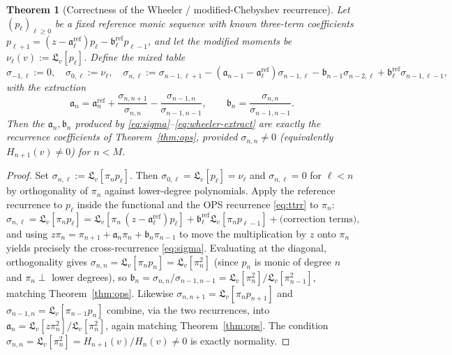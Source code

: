 \documentclass[11pt]{article}
\theoremstyle{plain}
\newtheorem{theorem}{Theorem}[section]
\theoremstyle{definition}
\theoremstyle{remark}
\begin{document}
\begin{theorem}[Correctness of the Wheeler / modified-Chebyshev recurrence]
\label{thm:wheeler}
Let $(p_\ell)_{\ell\ge0}$ be a fixed reference monic sequence with known
three-term coefficients $p_{\ell+1}=(z-\mathfrak a_\ell^{\mathrm{ref}})p_\ell
-\mathfrak b_\ell^{\mathrm{ref}}p_{\ell-1}$, and let the modified moments be
$\nu_\ell(v):=\mathfrak L_v[p_\ell]$. Define the mixed table
\begin{equation}\label{eq:sigma}
   \sigma_{-1,\ell}:=0,\quad \sigma_{0,\ell}:=\nu_\ell,\quad
   \sigma_{n,\ell}:=\sigma_{n-1,\ell+1}
      -(\mathfrak a_{n-1}-\mathfrak a_\ell^{\mathrm{ref}})\sigma_{n-1,\ell}
      -\mathfrak b_{n-1}\sigma_{n-2,\ell}
      +\mathfrak b_\ell^{\mathrm{ref}}\sigma_{n-1,\ell-1},
\end{equation}
with the extraction
\begin{equation}\label{eq:wheeler-extract}
   \mathfrak a_n=\mathfrak a_n^{\mathrm{ref}}
     +\frac{\sigma_{n,n+1}}{\sigma_{n,n}}-\frac{\sigma_{n-1,n}}{\sigma_{n-1,n-1}},
   \qquad
   \mathfrak b_n=\frac{\sigma_{n,n}}{\sigma_{n-1,n-1}} .
\end{equation}
Then the $\mathfrak a_n,\mathfrak b_n$ produced by \eqref{eq:sigma}--\eqref{eq:wheeler-extract}
are exactly the recurrence coefficients of Theorem~\ref{thm:ops}, provided
$\sigma_{n,n}\neq0$ (equivalently $H_{n+1}(v)\neq0$) for $n<M$.
\end{theorem}
\begin{proof}
Set $\sigma_{n,\ell}:=\mathfrak L_v[\pi_n p_\ell]$. Then $\sigma_{0,\ell}=
\mathfrak L_v[p_\ell]=\nu_\ell$ and $\sigma_{n,\ell}=0$ for $\ell<n$ by
orthogonality of $\pi_n$ against lower-degree polynomials. Apply the reference
recurrence to $p_\ell$ inside the functional and the OPS recurrence
\eqref{eq:ttrr} to $\pi_n$:
\[
   \sigma_{n,\ell}=\mathfrak L_v[\pi_n p_\ell]
   =\mathfrak L_v[\pi_n\,(z-\mathfrak a_\ell^{\mathrm{ref}})p_\ell]
   +\mathfrak b_\ell^{\mathrm{ref}}\mathfrak L_v[\pi_n p_{\ell-1}]
   +\bigl(\text{correction terms}\bigr),
\]
and using $z\pi_n=\pi_{n+1}+\mathfrak a_n\pi_n+\mathfrak b_n\pi_{n-1}$ to move the
multiplication by $z$ onto $\pi_n$ yields precisely the cross-recurrence
\eqref{eq:sigma}. Evaluating at the diagonal, orthogonality gives
$\sigma_{n,n}=\mathfrak L_v[\pi_n p_n]=\mathfrak L_v[\pi_n^2]$ (since $p_n$ is monic
of degree $n$ and $\pi_n\perp$ lower degrees), so
$\mathfrak b_n=\sigma_{n,n}/\sigma_{n-1,n-1}
=\mathfrak L_v[\pi_n^2]/\mathfrak L_v[\pi_{n-1}^2]$, matching
Theorem~\ref{thm:ops}. Likewise $\sigma_{n,n+1}=\mathfrak L_v[\pi_n p_{n+1}]$ and
$\sigma_{n-1,n}=\mathfrak L_v[\pi_{n-1}p_n]$ combine, via the two recurrences, into
$\mathfrak a_n=\mathfrak L_v[z\pi_n^2]/\mathfrak L_v[\pi_n^2]$, again matching
Theorem~\ref{thm:ops}. The condition $\sigma_{n,n}=\mathfrak L_v[\pi_n^2]=
H_{n+1}(v)/H_n(v)\neq0$ is exactly normality.
\end{proof}
\end{document}
